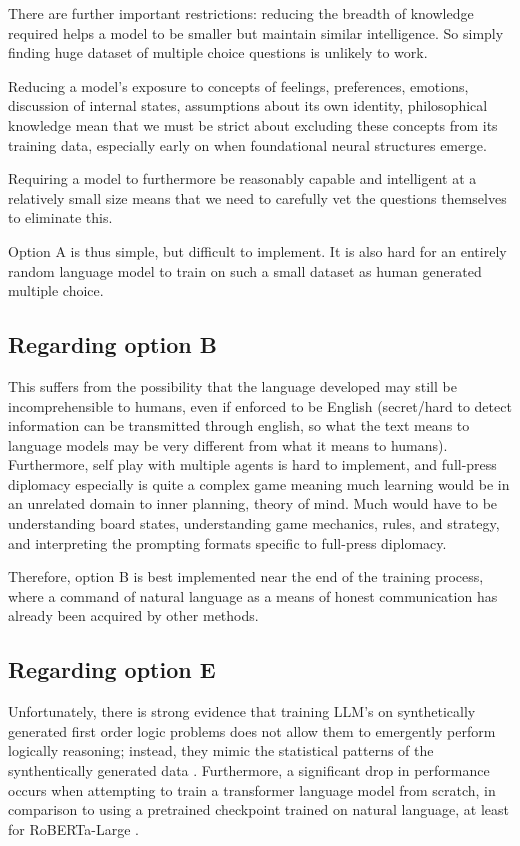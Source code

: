 \documentclass{article}
\begin{document}
There are further important restrictions: reducing the breadth of knowledge required helps a model to be smaller but maintain similar intelligence. So simply finding huge dataset of multiple choice questions is unlikely to work.

Reducing a model's exposure to concepts of feelings, preferences, emotions, discussion of internal states, assumptions about its own identity, philosophical knowledge mean that we must be strict about excluding these concepts from its training data, especially early on when foundational neural structures emerge.

Requiring a model to furthermore be reasonably capable and intelligent at a relatively small size means that we need to carefully vet the questions themselves to eliminate this.

Option A is thus simple, but difficult to implement. It is also hard for an entirely random language model to train on such a small dataset as human generated multiple choice.


\subsection{Regarding option B}

This suffers from the possibility that the language developed may still be incomprehensible to humans, even if enforced to be English (secret/hard to detect information can be transmitted through english, so what the text means to language models may be very different from what it means to humans). Furthermore, self play with multiple agents is hard to implement, and full-press diplomacy especially is quite a complex game meaning much learning would be in an unrelated domain to inner planning, theory of mind. Much would have to be understanding board states, understanding game mechanics, rules, and strategy, and interpreting the prompting formats specific to full-press diplomacy.

Therefore, option B is best implemented near the end of the training process, where a command of natural language as a means of honest communication has already been acquired by other methods.

\subsection{Regarding option E}

Unfortunately, there is strong evidence that training LLM's on synthetically generated first order logic problems does not allow them to emergently perform logically reasoning; instead, they mimic the statistical patterns of the synthentically generated data \citep{pirozelli2023assessing}. Furthermore, a significant drop in performance occurs when attempting to train a transformer language model from scratch, in comparison to using a pretrained checkpoint trained on natural language, at least for RoBERTa-Large \citep{han2022folio}.
\end{document}
